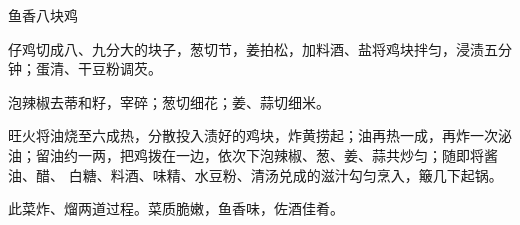 %
%
%
%
%
%
%
\begin{recipe}{鱼香八块鸡}

\ingredients


\preparation

\step 仔鸡切成八、九分大的块子，葱切节，姜拍松，加料酒、盐将鸡块拌匀，浸渍五分
钟；蛋清、干豆粉调芡。

\step 泡辣椒去蒂和籽，宰碎；葱切细花；姜、蒜切细米。

\step 旺火将油烧至六成热，分散投入渍好的鸡块，炸黄捞起；油再热一成，再炸一次泌
油；留油约一两，把鸡拨在一边，依次下泡辣椒、葱、姜、蒜共炒匀；随即将酱油、醋、
白糖、料酒、味精、水豆粉、清汤兑成的滋汁勾匀烹入，簸几下起锅。

\features

此菜炸、熘两道过程。菜质脆嫩，鱼香味，佐酒佳肴。

\end{recipe}

